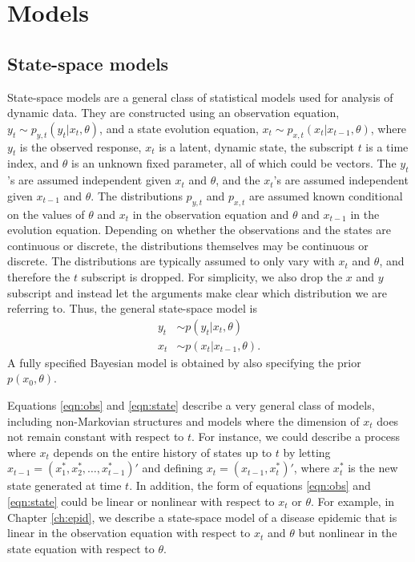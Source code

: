 \chapter{Models \label{ch:models}}

\section{State-space models \label{sec:ss}}

State-space models are a general class of statistical models used for analysis of dynamic data.  They are constructed using an observation equation, $y_t \sim p_{y,t}(y_t|x_t,\theta)$, and a state evolution equation, $x_t \sim p_{x,t}(x_t|x_{t-1},\theta)$, where $y_t$ is the observed response, $x_t$ is a latent, dynamic state, the subscript $t$ is a time index, and $\theta$ is an unknown fixed parameter, all of which could be vectors. The $y_t$'s are assumed independent given $x_t$ and $\theta$, and the $x_t$'s are assumed independent given $x_{t-1}$ and $\theta$. The distributions $p_{y,t}$ and $p_{x,t}$ are assumed known conditional on the values of $\theta$ and $x_t$ in the observation equation and $\theta$ and $x_{t-1}$ in the evolution equation. Depending on whether the observations and the states are continuous or discrete, the distributions themselves may be continuous or discrete. The distributions are typically assumed to only vary with $x_t$ and $\theta$, and therefore the $t$ subscript is dropped. For simplicity, we also drop the $x$ and $y$ subscript and instead let the arguments make clear which distribution we are referring to. Thus, the general state-space model is
\begin{align}
y_t &\sim p(y_t|x_t,\theta) \label{eqn:obs} \\
x_t &\sim p(x_t|x_{t-1},\theta). \label{eqn:state}
\end{align}
A fully specified Bayesian model is obtained by also specifying the prior $p(x_0,\theta)$.

Equations \eqref{eqn:obs} and \eqref{eqn:state} describe a very general class of models, including non-Markovian structures and models where the dimension of $x_t$ does not remain constant with respect to $t$. For instance, we could describe a process where $x_t$ depends on the entire history of states up to $t$ by letting $x_{t-1} = (x^*_1, x^*_2, \ldots, x^*_{t-1})'$ and defining $x_t = (x_{t-1}, x^*_t)'$, where $x^*_t$ is the new state generated at time $t$. In addition, the form of equations \eqref{eqn:obs} and \eqref{eqn:state} could be linear or nonlinear with respect to $x_t$ or $\theta$. For example, in Chapter \ref{ch:epid}, we describe a state-space model of a disease epidemic that is linear in the observation equation with respect to $x_t$ and $\theta$ but nonlinear in the state equation with respect to $\theta$.

